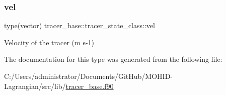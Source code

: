 \subsubsection{\texorpdfstring{vel}{vel}}
{\footnotesize\ttfamily type(vector) tracer\+\_\+base\+::tracer\+\_\+state\+\_\+class\+::vel\hspace{0.3cm}{\ttfamily [private]}}



Velocity of the tracer (m s-\/1) 



The documentation for this type was generated from the following file\+:\begin{DoxyCompactItemize}
\item 
C\+:/\+Users/administrator/\+Documents/\+Git\+Hub/\+M\+O\+H\+I\+D-\/\+Lagrangian/src/lib/\hyperlink{tracer__base_8f90}{tracer\+\_\+base.\+f90}\end{DoxyCompactItemize}

